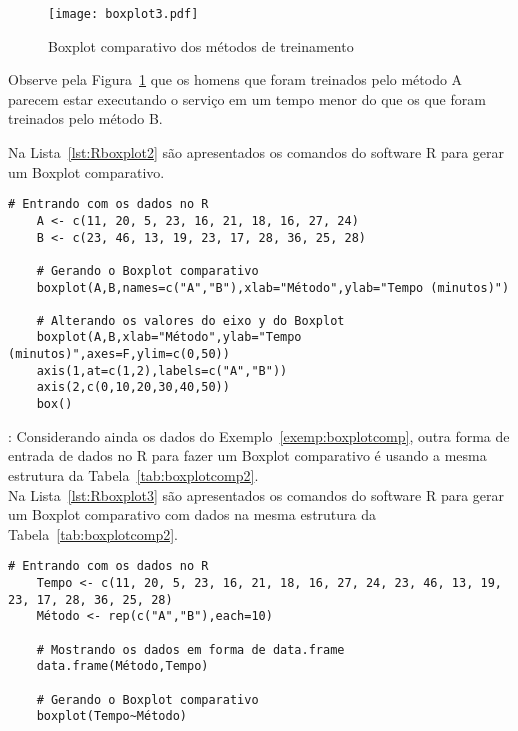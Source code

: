 \documentclass[11pt,fleqn]{book} %
\begin{document}
\begin{example}
\begin{figure}[H]
\centering\texttt{[image: boxplot3.pdf]}
\caption{Boxplot comparativo dos métodos de treinamento}
\label{fig:boxplot3} %
\end{figure}

Observe pela Figura~\ref{fig:boxplot3} que os homens que foram treinados pelo método A parecem estar executando o serviço em um tempo menor do que os que foram treinados pelo método B.

\end{example} 

\vspace{0,3cm}

Na Lista~\ref{lst:Rboxplot2} são apresentados os comandos do software R para gerar um Boxplot comparativo. \\

\begin{scriptsize}
	\estiloR
	\begin{lstlisting}[caption={Comandos do software R}, label=lst:Rboxplot2]
	# Entrando com os dados no R
	A <- c(11, 20, 5, 23, 16, 21, 18, 16, 27, 24)
	B <- c(23, 46, 13, 19, 23, 17, 28, 36, 25, 28)

	# Gerando o Boxplot comparativo
	boxplot(A,B,names=c("A","B"),xlab="Método",ylab="Tempo (minutos)")
	
	# Alterando os valores do eixo y do Boxplot
	boxplot(A,B,xlab="Método",ylab="Tempo (minutos)",axes=F,ylim=c(0,50))
	axis(1,at=c(1,2),labels=c("A","B"))
	axis(2,c(0,10,20,30,40,50))
	box()

	\end{lstlisting}
\end{scriptsize}

\vspace{0,3cm}

: Considerando ainda os dados do Exemplo~\ref{exemp:boxplotcomp}, outra forma de entrada de dados no R para fazer um Boxplot comparativo é usando a mesma estrutura da Tabela~\ref{tab:boxplotcomp2}. \\

Na Lista~\ref{lst:Rboxplot3} são apresentados os comandos do software R para gerar um Boxplot comparativo com dados na mesma estrutura da Tabela~\ref{tab:boxplotcomp2}. \\

\begin{scriptsize}
	\estiloR
	\begin{lstlisting}[caption={Comandos do software R}, label=lst:Rboxplot3]
	# Entrando com os dados no R
	Tempo <- c(11, 20, 5, 23, 16, 21, 18, 16, 27, 24, 23, 46, 13, 19, 23, 17, 28, 36, 25, 28)
	Método <- rep(c("A","B"),each=10)

	# Mostrando os dados em forma de data.frame
	data.frame(Método,Tempo)

	# Gerando o Boxplot comparativo
	boxplot(Tempo~Método)

	\end{lstlisting}
\end{scriptsize}
\end{document}
